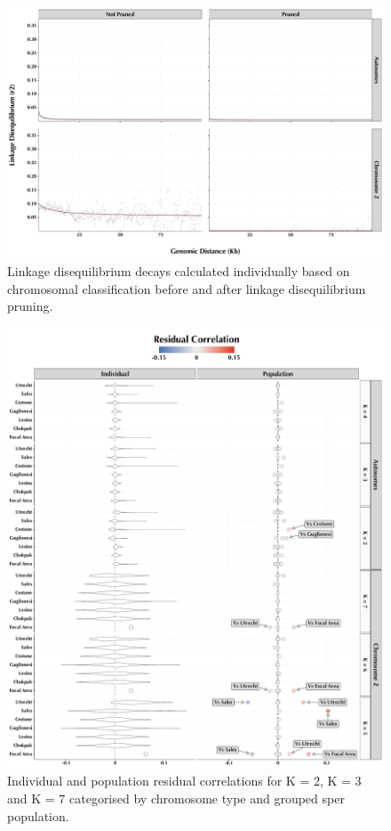 \begin{figure}
    \centering
    \includegraphics[width=\linewidth]{Figures/Y150239Genomics--LD.pdf}
    \caption{Linkage disequilibrium decays calculated individually based on chromosomal classification before and after linkage disequilibrium pruning.}
    \label{fig:SIfigure-04}
\end{figure}

\begin{figure}
    \centering
    \includegraphics[width=\linewidth]{Figures/Y150239Genomics--evalAdmix_Points.pdf}
    \caption{Individual and population residual correlations for K = 2, K = 3 and K = 7 categorised by chromosome type and grouped sper population.}
    \label{fig:SIfigure-05}
\end{figure}

